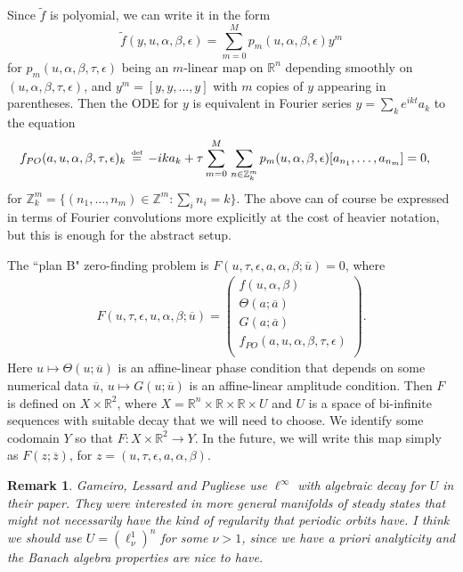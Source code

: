 \documentclass[10pt]{article}
\newcommand{\bydef}{\,\stackrel{\mbox{\tiny\textnormal{\raisebox{0ex}[0ex][0ex]{def}}}}{=}\,}
\newcommand{\R}{\mathbb{R}}
\newcommand{\Z}{\mathbb{Z}}
\newtheorem{remark}[rem]{Remark}
\begin{document}
Since $\tilde f$ is polyomial, we can write it in the form
$$\tilde f(y,u,\alpha,\beta,\epsilon) = \sum_{m=0}^Mp_m(u,\alpha,\beta,\epsilon)y^m$$
for $p_m(u,\alpha,\beta,\tau,\epsilon)$ being an $m$-linear map on $\R^n$ depending smoothly on $(u,\alpha,\beta,\tau,\epsilon)$, and $y^m=[y,y,\dots,y]$ with $m$ copies of $y$ appearing in parentheses. Then the ODE for $y$ is equivalent in Fourier series $y=\sum_k e^{ikt}a_k$ to the equation
\begin{align*}
f_{PO}(a,u,\alpha,\beta,\tau,\epsilon)_k&\bydef-ika_k + \tau\sum_{m=0}^M\hspace{0.5mm}\sum_{n\in \Z^m_k}p_m(u,\alpha,\beta,\epsilon)[a_{n_1},\dots,a_{n_m}]=0,
\end{align*}
for $\Z_k^m=\{(n_1,\dots,n_m)\in\Z^m : \sum_i n_i = k\}.$ The above can of course be expressed in terms of Fourier convolutions more explicitly at the cost of heavier notation, but this is enough for the abstract setup.

The ``plan B" zero-finding problem is $F(u,\tau,\epsilon,a,\alpha,\beta ; \overline u)=0$, where
\begin{align}\label{zfp-B}
F(u,\tau,\epsilon,u,\alpha,\beta; \overline u)=\left(\begin{array}{c}f(u,\alpha,\beta) \\ \Theta(a;\overline a) \\ G(a;\overline a) \\ f_{PO}(a,u,\alpha,\beta,\tau,\epsilon) \\  \end{array}\right).
\end{align}
Here $u\mapsto\Theta(u;\overline u)$ is an affine-linear phase condition that depends on some numerical data $\overline u$, $u\mapsto G(u;\overline u)$ is an affine-linear amplitude condition. Then $F$ is defined on $X\times\R^2$, where $X=\R^n\times\R\times\R\times U$ and $U$ is a space of bi-infinite sequences with suitable decay that we will need to choose. We identify some codomain $Y$ so that $F:X\times\R^2\rightarrow Y$. In the future, we will write this map simply as $F(z;\overline z)$, for $z=(u,\tau,\epsilon,a,\alpha,\beta)$.

\begin{remark}
Gameiro, Lessard and Pugliese use $\ell^\infty$ with algebraic decay for $U$ in their paper. They were interested in more general manifolds of steady states that might not necessarily have the kind of regularity that periodic orbits have. I think we should use $U=(\ell_\nu^1)^n$ for some $\nu>1$, since we have a priori analyticity and the Banach algebra properties are nice to have.
\end{remark}
\end{document}
